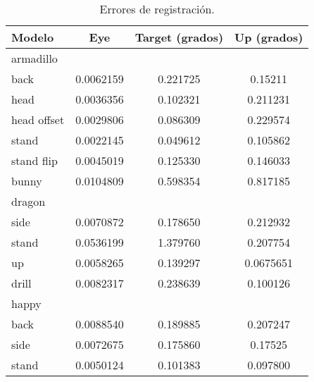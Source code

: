 \begin{table}
	\centering
	\begin{tabular}{l*{3}{c}}
		\toprule
		Modelo                   &    Eye          &    Target (grados)        &    Up (grados)\\
		\midrule
		armadillo\\
		{\Em}back          &     0.0062159   &   0.221725     &    0.15211\\
		{\Em}head          &     0.0036356  &    0.102321     &    0.211231\\
		{\Em}head offset   &     0.0029806  &    0.086309     &    0.229574\\
		{\Em}stand         &     0.0022145  &    0.049612     &    0.105862\\
		{\Em}stand flip    &     0.0045019  &    0.125330     &    0.146033\\
		\midrule
		bunny                   &     0.0104809   &   0.598354     &    0.817185\\
		\midrule
		dragon\\
		{\Em}side             &     0.0070872  &    0.178650     &    0.212932\\
		{\Em}stand            &     0.0536199   &   1.379760     &    0.207754\\
		{\Em}up               &     0.0058265  &    0.139297     &    0.0675651\\
		\midrule
		drill                   &     0.0082317  &    0.238639     &    0.100126\\
		\midrule
		happy\\
		{\Em}back              &     0.0088540  &    0.189885     &    0.207247\\
		{\Em}side              &     0.0072675   &   0.175860     &    0.17525\\
		{\Em}stand             &     0.0050124  &    0.101383     &    0.097800\\
		\bottomrule
	\end{tabular}
	\caption[Errores de registración]{\label{tab:reg_error}Errores de registración.}
\end{table}
